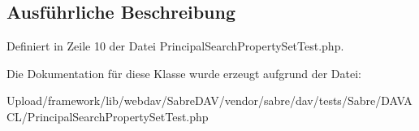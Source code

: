 \subsection{Ausführliche Beschreibung}


Definiert in Zeile 10 der Datei Principal\+Search\+Property\+Set\+Test.\+php.



Die Dokumentation für diese Klasse wurde erzeugt aufgrund der Datei\+:\begin{DoxyCompactItemize}
\item 
Upload/framework/lib/webdav/\+Sabre\+D\+A\+V/vendor/sabre/dav/tests/\+Sabre/\+D\+A\+V\+A\+C\+L/Principal\+Search\+Property\+Set\+Test.\+php\end{DoxyCompactItemize}

